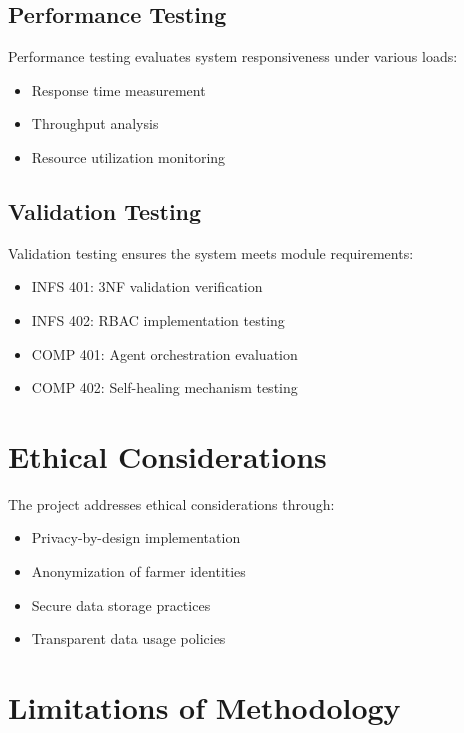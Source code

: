 \subsection{Performance Testing}

Performance testing evaluates system responsiveness under various loads:

\begin{itemize}
    \item Response time measurement
    \item Throughput analysis
    \item Resource utilization monitoring
\end{itemize}

\subsection{Validation Testing}

Validation testing ensures the system meets module requirements:

\begin{itemize}
    \item INFS 401: 3NF validation verification
    \item INFS 402: RBAC implementation testing
    \item COMP 401: Agent orchestration evaluation
    \item COMP 402: Self-healing mechanism testing
\end{itemize}

\section{Ethical Considerations}

The project addresses ethical considerations through:

\begin{itemize}
    \item Privacy-by-design implementation
    \item Anonymization of farmer identities
    \item Secure data storage practices
    \item Transparent data usage policies
\end{itemize}

\section{Limitations of Methodology}

